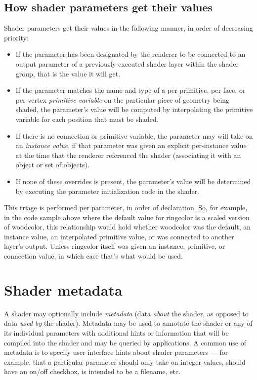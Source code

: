 \documentclass[11pt,letterpaper]{book}
\begin{document}
\subsection{How shader parameters get their values}

Shader parameters get their values in the following manner,
in order of decreasing priority:

\begin{itemize}
\item If the parameter has been designated by the renderer to be
  connected to an output parameter of a previously-executed shader layer
  within the shader group, that is the value it will get.
\item If the parameter matches the name and type of a per-primitive,
  per-face, or per-vertex \emph{primitive variable} on the particular
  piece of geometry being shaded, the parameter's value will be computed
  by interpolating the primitive variable for each position that must be
  shaded.
\item If there is no connection or primitive variable, the parameter may
  will take on an \emph{instance value}, if that parameter was given an
  explicit per-instance value at the time that the renderer referenced
  the shader (associating it with an object or set of objects).
\item If none of these overrides is present, the parameter's value will
  be determined by executing the parameter initialization code in the
  shader.
\end{itemize}

This triage is performed per parameter, in order of declaration.  So,
for example, in the code sample above where the default value for {\cf
  ringcolor} is a scaled version of {\cf woodcolor}, this relationship
would hold whether {\cf woodcolor} was the default, an instance value,
an interpolated primitive value, or was connected to another layer's
output.  Unless {\cf ringcolor} itself was given an instance, primitive,
or connection value, in which case that's what would be used.



\section{Shader metadata}
\label{sec:metadata}
 

A shader may optionally include \emph{metadata} (data \emph{about} the
shader, as opposed to data \emph{used by} the shader).  Metadata may be
used to annotate the shader or any of its individual parameters with
additional hints or information that will be compiled into the shader
and may be queried by applications.  A common use of metadata is to
specify user interface hints about shader parameters --- for example,
that a particular parameter should only take on integer values, should
have an on/off checkbox, is intended to be a filename, etc.
\end{document}
